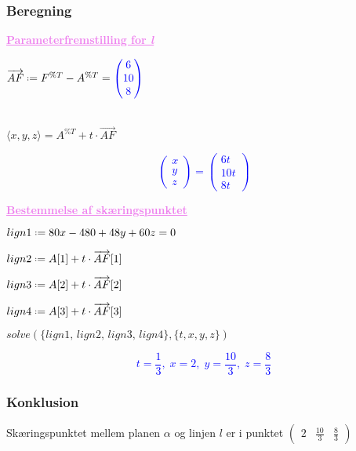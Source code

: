 \documentclass[../main.tex]{subfiles}
\begin{document}
    \subsubsection*{Beregning}
        \hspace{\parindent} \textcolor{violet}{\textbf{\underline{Parameterfremstilling for \textit{l}}}}\\
        \par \(\overrightarrow{AF} \defeq F^{\%T}-A^{\%T} = \textcolor{blue}{\begin{pmatrix} 6 \\ 10\\ 8\end{pmatrix}}\)\\\\
        \par \(\langle x, y, z \rangle = A^{\%T}+ t\cdot \overrightarrow{AF}\)
        \par \textcolor{blue}{\[\begin{pmatrix} x \\ y\\ z\end{pmatrix}=\begin{pmatrix} 6t \\ 10t\\ 8t\end{pmatrix}\]}
        \par \textcolor{violet}{\textbf{\underline{Bestemmelse af skæringspunktet}}}\\
        \par \(lign1 \defeq 80 x-480+48y+60z=0\)\\
        \par \(lign2 \defeq A[1]+t\cdot \overrightarrow{AF}[1]\)\\
        \par \(lign3 \defeq A[2]+t\cdot \overrightarrow{AF}[2]\)\\
        \par \(lign4 \defeq A[3]+t\cdot \overrightarrow{AF}[3]\)\\
        \par \(solve(\{lign1,\, lign2,\, lign 3,\, lign4\},\{t,x,y,z\})\)
        \par \textcolor{blue}{\[t=\frac{1}{3},\; x=2,\; y=\frac{10}{3},\; z=\frac{8}{3}\]}
    \subsubsection*{Konklusion}
        Skæringspunktet mellem planen \(\alpha\) og linjen \(l\) er i punktet \(\displaystyle \begin{pmatrix}2 & \frac{10}{3} & \frac{8}{3} \end{pmatrix}\)
        
\end{document}

